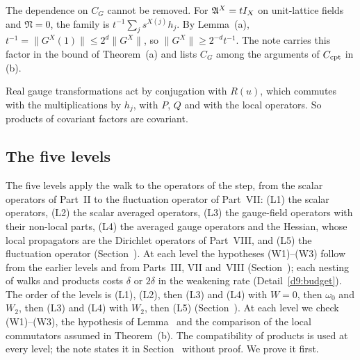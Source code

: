 \begin{detail}
\begin{step}
The dependence on $C_G$ cannot be removed. For $\mathfrak A^X=tI_X$ on unit-lattice fields and $\mathfrak N=0$, the family is $t^{-1}\sum_js^{X(j)}h_j$. By Lemma~(a), $t^{-1}=\|G^X(1)\|\le2^d\|G^X\|$, so $\|G^X\|\ge2^{-d}t^{-1}$. The note carries this factor in the bound of Theorem~(a) and lists $C_G$ among the arguments of $C_{\rm cpt}$ in (b).
\end{step}
\begin{step}[(c)]
Real gauge transformations act by conjugation with $R(u)$, which commutes with the multiplications by $h_j$, with $P$, $Q$ and with the local operators. So products of covariant factors are covariant.
\end{step}
\end{detail}

\subsection{The five levels}\label{d9:levels}

The five levels apply the walk to the operators of the step, from the scalar operators of Part~II to the fluctuation operator of Part~VII: (L1) the scalar operators, (L2) the scalar averaged operators, (L3) the gauge-field operators with their non-local parts, (L4) the averaged gauge operators and the Hessian, whose local propagators are the Dirichlet operators of Part~VIII, and (L5) the fluctuation operator (Section~). At each level the hypotheses (W1)--(W3) follow from the earlier levels and from Parts~III, VII and~VIII (Section~); each nesting of walks and products costs $\delta$ or $2\delta$ in the weakening rate (Detail~\ref{d9:budget}). The order of the levels is (L1), (L2), then (L3) and (L4) with $W=0$, then $\omega_0$ and $W_2$, then (L3) and (L4) with $W_2$, then (L5) (Section~). At each level we check (W1)--(W3), the hypothesis of Lemma~ and the comparison of the local commutators assumed in Theorem~(b). The compatibility of products is used at every level; the note states it in Section~ without proof. We prove it first.

